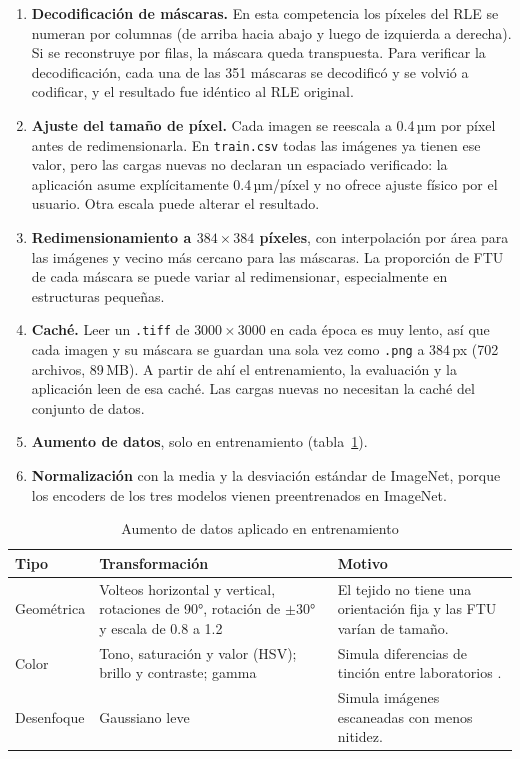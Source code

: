 \documentclass[11pt,letterpaper]{article}
\begin{document}
\begin{enumerate}
  \item \textbf{Decodificación de máscaras.} En esta competencia los píxeles del RLE se numeran por
        columnas (de arriba hacia abajo y luego de izquierda a derecha). Si se reconstruye por filas,
        la máscara queda transpuesta. Para verificar la decodificación, cada una de las 351 máscaras
        se decodificó y se volvió a codificar, y el resultado fue idéntico al RLE original.
  \item \textbf{Ajuste del tamaño de píxel.} Cada imagen se reescala a 0.4\,µm por píxel antes de
        redimensionarla. En \texttt{train.csv} todas las imágenes ya tienen ese valor, pero las
        cargas nuevas no declaran un espaciado verificado: la aplicación asume explícitamente
        0.4\,µm/píxel y no ofrece ajuste físico por el usuario. Otra escala puede alterar el resultado.
  \item \textbf{Redimensionamiento a $384 \times 384$ píxeles}, con interpolación por área para las
        imágenes y vecino más cercano para las máscaras. La proporción de FTU de cada máscara se
        puede variar al redimensionar, especialmente en estructuras pequeñas.
  \item \textbf{Caché.} Leer un \texttt{.tiff} de $3000 \times 3000$ en cada época es muy lento, así
        que cada imagen y su máscara se guardan una sola vez como \texttt{.png} a 384\,px (702
        archivos, 89\,MB). A partir de ahí el entrenamiento, la evaluación y la aplicación leen de
        esa caché. Las cargas nuevas no necesitan la caché del conjunto de datos.
  \item \textbf{Aumento de datos}, solo en entrenamiento (tabla~\ref{tab:augmentation}).
  \item \textbf{Normalización} con la media y la desviación estándar de ImageNet, porque los encoders
        de los tres modelos vienen preentrenados en ImageNet.
\end{enumerate}

\begin{table}[H]
\centering
\caption{Aumento de datos aplicado en entrenamiento}\label{tab:augmentation}
\begin{tabular}{lp{5.6cm}p{5.4cm}}
\toprule
\textbf{Tipo} & \textbf{Transformación} & \textbf{Motivo} \\
\midrule
Geométrica  & Volteos horizontal y vertical, rotaciones de 90°, rotación de $\pm$30° y escala de
              0.8 a 1.2 & El tejido no tiene una orientación fija y las FTU varían de tamaño. \\
Color       & Tono, saturación y valor (HSV); brillo y contraste; gamma & Simula diferencias de
              tinción entre laboratorios \parencite{tellez2019stain}. \\
Desenfoque  & Gaussiano leve & Simula imágenes escaneadas con menos nitidez. \\
\bottomrule
\end{tabular}
\end{table}
\end{document}
